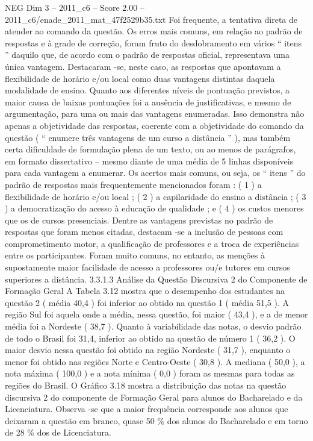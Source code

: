 \begin{textsample}{NEG Dim 3 – 2011\_c6 – Score 2.00 – 2011\_c6/enade\_2011\_mat\_47f2529b35.txt}
Foi frequente, a tentativa direta de atender ao comando da questão.
Os erros mais comuns, em relação ao padrão de respostas e à grade de correção, foram fruto do desdobramento em vários “ itens ” daquilo que, de acordo com o padrão de respostas oficial, representava uma única vantagem.
Destacaram -se, neste caso, as respostas que apontavam a flexibilidade de horário e/ou local como duas vantagens distintas daquela modalidade de ensino.
Quanto aos diferentes níveis de pontuação previstos, a maior causa de baixas pontuações foi a ausência de justificativas, e mesmo de argumentação, para uma ou mais das vantagens enumeradas.
Isso demonstra não apenas a objetividade das respostas, coerente com a objetividade do comando da questão ( “ enumere três vantagens de um curso a distância ” ), mas também certa dificuldade de formulação plena de um texto, ou ao menos de parágrafos, em formato dissertativo – mesmo diante de uma média de 5 linhas disponíveis para cada vantagem a enumerar.
Os acertos mais comuns, ou seja, os “ itens ” do padrão de respostas mais frequentemente mencionados foram : ( 1 ) a flexibilidade de horário e/ou local ; ( 2 ) a capilaridade do ensino a distância ; ( 3 ) a democratização do acesso à educação de qualidade ; e ( 4 ) os custos menores que os de cursos presenciais.
Dentre as vantagens previstas no padrão de respostas que foram menos citadas, destacam -se a inclusão de pessoas com comprometimento motor, a qualificação de professores e a troca de experiências entre os participantes.
Foram muito comuns, no entanto, as menções à supostamente maior facilidade de acesso a professores ou/e tutores em cursos superiores a distância. 3.3.1.3 Análise da Questão Discursiva 2 do Componente de Formação Geral A Tabela 3.12 mostra que o desempenho dos estudantes na questão 2 ( média 40,4 ) foi inferior ao obtido na questão 1 ( média 51,5 ).
A região Sul foi aquela onde a média, nessa questão, foi maior ( 43,4 ), e a de menor média foi a Nordeste ( 38,7 ).
Quanto à variabilidade das notas, o desvio padrão de todo o Brasil foi 31,4, inferior ao obtido na questão de número 1 ( 36,2 ).
O maior desvio nessa questão foi obtido na região Nordeste ( 31,7 ), enquanto o menor foi obtido nas regiões Norte e Centro-Oeste ( 30,8 ).
A mediana ( 50,0 ), a nota máxima ( 100,0 ) e a nota mínima ( 0,0 ) foram as mesmas para todas as regiões do Brasil.
O Gráfico 3.18 mostra a distribuição das notas na questão discursiva 2 do componente de Formação Geral para alunos do Bacharelado e da Licenciatura.
Observa -se que a maior frequência corresponde aos alunos que deixaram a questão em branco, quase 50 \% dos alunos do Bacharelado e em torno de 28 \% dos de Licenciatura.

\end{textsample}
